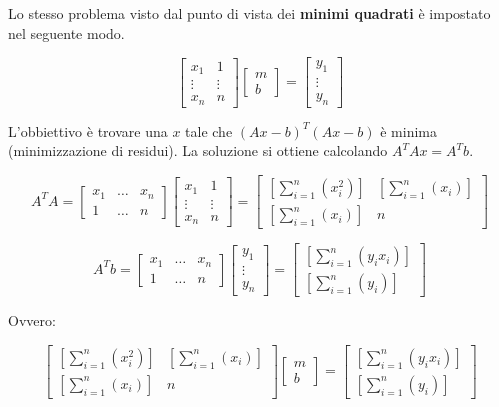 \documentclass[\main/main.tex]{subfiles}
\begin{document}
Lo stesso problema visto dal punto di vista dei \textbf{minimi quadrati} è impostato nel seguente modo.

\[
\begin{bmatrix}
	x_1 & 1\\
	\vdots & \vdots \\
	x_n & n
\end{bmatrix}
\begin{bmatrix}
	m\\
	b
\end{bmatrix}
= 
\begin{bmatrix}
	y_1\\
	\vdots\\
	y_n
\end{bmatrix}
\]

L'obbiettivo è trovare una $x$ tale che $(Ax-b)^T(Ax-b)$ è minima (minimizzazione di residui).
La soluzione si ottiene calcolando $A^TAx = A^Tb$.

\[
A^TA = \begin{bmatrix}
	x_1 & \dots & x_n\\
	1 & \dots & n
\end{bmatrix}
\begin{bmatrix}
	x_1 & 1\\
	\vdots & \vdots \\
	x_n & n
\end{bmatrix}
=
\begin{bmatrix}
	\left [ \sum_{i=1}^n \left(x_i^2 \right) \right ] &  \left [ \sum_{i=1}^n \left(x_i \right) \right ] \\
	\left [ \sum_{i=1}^n \left(x_i \right) \right ] & n
\end{bmatrix}
\]

\[
A^Tb = \begin{bmatrix}
	x_1 & \dots & x_n\\
	1 & \dots & n
\end{bmatrix}
\begin{bmatrix}
	y_1\\
	\vdots\\
	y_n
\end{bmatrix}
=
\begin{bmatrix}
	\left [ \sum_{i=1}^n \left(y_i x_i \right) \right ] \\
	\left [ \sum_{i=1}^n \left(y_i \right) \right ]
\end{bmatrix}
\]

Ovvero:

\[
\begin{bmatrix}
	\left [ \sum_{i=1}^n \left(x_i^2 \right) \right ] &  \left [ \sum_{i=1}^n \left(x_i \right) \right ] \\
	\left [ \sum_{i=1}^n \left(x_i \right) \right ] & n
\end{bmatrix}
\begin{bmatrix}
m\\
b
\end{bmatrix}
= 
\begin{bmatrix}
	\left [ \sum_{i=1}^n \left(y_i x_i \right) \right ] \\
	\left [ \sum_{i=1}^n \left(y_i \right) \right ]
\end{bmatrix}
\]
\end{document}
